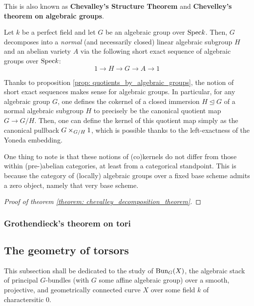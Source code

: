                 \begin{theorem} \label{theorem: chevalley_decomposition_theorem}
                    This is also known as \textbf{Chevalley's Structure Theorem} and \textbf{Chevelley's theorem on algebraic groups}.
                
                    Let $k$ be a perfect field and let $G$ be an algebraic group over $\mathrm{Spec} k$. Then, $G$ decomposes into a \textit{normal} (and necessarily closed) linear algebraic subgroup $H$ and an abelian variety $A$ via the following short exact sequence of algebraic groups over $\mathrm{Spec} k$:
                        $$1 \to H \to G \to A \to 1$$
                \end{theorem}
                \begin{remark} \label{remark: short_exact_sequences_algebraic_groups}
                    Thanks to proposition \ref{prop: quotients_by_algebraic_groups}, the notion of short exact sequences makes sense for algebraic groups. In particular, for any algebraic group $G$, one defines the cokernel of a closed immersion $H \trianglelefteq G$ of a normal algebraic subgroup $H$ to precisely be the canonical quotient map $G \to G/H$. Then, one can define the kernel of this quotient map simply as the canonical pullback $G \x_{G/H} 1$, which is possible thanks to the left-exactness of the Yoneda embedding. 
                    
                    One thing to note is that these notions of (co)kernels do not differ from those within (pre-)abelian categories, at least from a categorical standpoint. This is because the category of (locally) algebraic groups over a fixed base scheme admits a zero object, namely that very base scheme. 
                \end{remark}
                    \begin{proof}[Proof of theorem \ref{theorem: chevalley_decomposition_theorem}]
                        
                    \end{proof}
            
            \subsubsection{Grothendieck's theorem on tori}
            
        \subsection{The geometry of torsors}
            This subsection shall be dedicated to the study of $\mathrm{Bun}_G(X)$, the algebraic stack of principal $G$-bundles (with $G$ some affine algebraic group) over a smooth, projective, and geometrically connected curve $X$ over some field $k$ of charactersitic $0$. 
            
